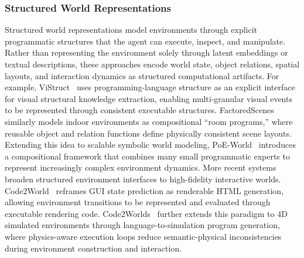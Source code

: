 \subsubsection{Structured World Representations}
Structured world representations model environments through
explicit programmatic structures that the agent can execute,
inspect, and manipulate.
Rather than representing the environment solely through latent
embeddings or textual descriptions, these approaches encode world
state, object relations, spatial layouts, and interaction
dynamics as structured computational artifacts.
For example, ViStruct~\cite{chen2023vistruct} uses
programming-language structure as an explicit interface for
visual structural knowledge extraction, enabling multi-granular
visual events to be represented through consistent executable
structures.
FactoredScenes~\cite{hsu2025programs} similarly models indoor
environments as compositional ``room programs,'' where reusable
object and relation functions define physically consistent scene
layouts.
Extending this idea to scalable symbolic world modeling,
PoE-World~\cite{piriyakulkij2025poe} introduces a compositional
framework that combines many small programmatic experts to
represent increasingly complex environment dynamics.
More recent systems broaden structured environment interfaces to
high-fidelity interactive worlds.
Code2World~\cite{zheng2026code2world} reframes GUI state
prediction as renderable HTML generation, allowing environment
transitions to be represented and evaluated through executable
rendering code.
Code2Worlds~\cite{zhang2026code2worlds} further extends this
paradigm to 4D simulated environments through language-to-simulation
program generation, where physics-aware execution loops
reduce semantic-physical inconsistencies during environment
construction and interaction.


